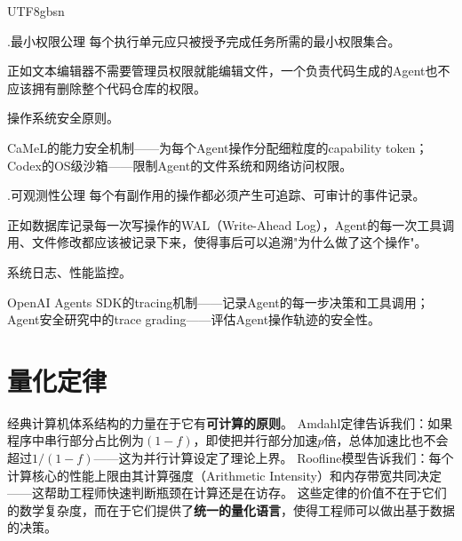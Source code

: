 \documentclass[11pt,a4paper]{article}
\newcounter{axiom}[section]
\renewcommand{\theaxiom}{\thesection.\arabic{axiom}}
\begin{document}
\begin{CJK*}{UTF8}{gbsn}
\begin{axiombox}{\theaxiom\enspace 最小权限公理}
每个执行单元应只被授予完成任务所需的最小权限集合。
\end{axiombox}
\begin{description}[style=nextline,leftmargin=2em,font=\bfseries]
\item[直观解释] 正如文本编辑器不需要管理员权限就能编辑文件，一个负责代码生成的Agent也不应该拥有删除整个代码仓库的权限。
\item[经典来源] 操作系统安全原则\cite{ostep_2023}。
\item[ICAM体现] CaMeL的能力安全机制\cite{debenedetti2025camel}——为每个Agent操作分配细粒度的capability token；Codex的OS级沙箱\cite{openai_codex_security_2026}——限制Agent的文件系统和网络访问权限。
\end{description}

\begin{axiombox}{\theaxiom\enspace 可观测性公理}
每个有副作用的操作都必须产生可追踪、可审计的事件记录。
\end{axiombox}
\begin{description}[style=nextline,leftmargin=2em,font=\bfseries]
\item[直观解释] 正如数据库记录每一次写操作的WAL（Write-Ahead Log），Agent的每一次工具调用、文件修改都应该被记录下来，使得事后可以追溯"为什么做了这个操作"。
\item[经典来源] 系统日志、性能监控\cite{linux_cgroup_2026}。
\item[ICAM体现] OpenAI Agents SDK的tracing机制\cite{openai_codex_agentsdk_2026}——记录Agent的每一步决策和工具调用；Agent安全研究中的trace grading\cite{agenticsecurity2025}——评估Agent操作轨迹的安全性。
\end{description}

\section{量化定律}
\label{sec:laws}

经典计算机体系结构的力量在于它有\textbf{可计算的原则}。
Amdahl定律告诉我们：如果程序中串行部分占比例为$(1-f)$，即使把并行部分加速$p$倍，总体加速比也不会超过$1/(1-f)$——这为并行计算设定了理论上界\cite{hennessy2017quantitative}。
Roofline模型告诉我们：每个计算核心的性能上限由其计算强度（Arithmetic Intensity）和内存带宽共同决定——这帮助工程师快速判断瓶颈在计算还是在访存\cite{hennessy2017quantitative}。
这些定律的价值不在于它们的数学复杂度，而在于它们提供了\textbf{统一的量化语言}，使得工程师可以做出基于数据的决策。


\end{CJK*}
\end{document}
